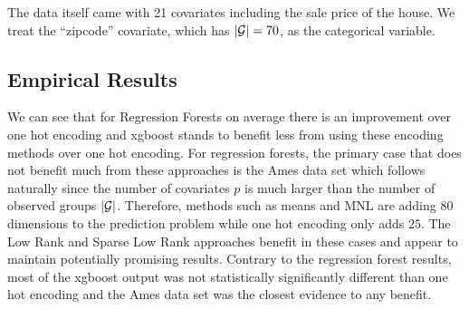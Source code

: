 \documentclass{article}
\theoremstyle{plain}
\theoremstyle{definition}
\theoremstyle{remark}
\begin{document}
The data itself came with 21 covariates including the sale price of the house. We treat the ``zipcode'' covariate, which has $|\mathcal{G}|=70$, as the categorical variable.




\subsection{Empirical Results}


We can see that for Regression Forests on average there is an improvement over one hot encoding and xgboost stands to benefit less from using these encoding methods over one hot encoding. For regression forests, the primary case that does not benefit much from these approaches is the Ames data set which follows naturally since the number of covariates $p$ is much larger than the number of observed groups $|\mathcal{G}|$. Therefore, methods such as means and MNL are adding $80$ dimensions to the prediction problem while one hot encoding only adds $25$. The Low Rank and Sparse Low Rank approaches benefit in these cases and appear to maintain potentially promising results. Contrary to the regression forest results, most of the xgboost output was not statistically significantly different than one hot encoding and the Ames data set was the closest evidence to any benefit.
\end{document}
